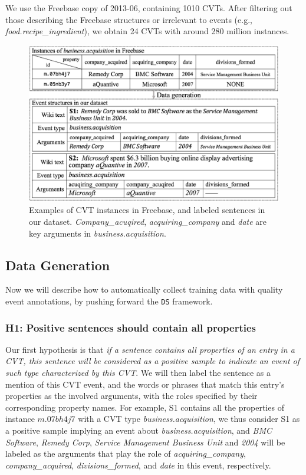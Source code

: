 We use the Freebase copy of 2013-06,  %
containing 1010 CVTs. After filtering out those %
describing the Freebase structures  or irrelevant to events (e.g., \emph{food.recipe\_ingredient}), we obtain 24 CVTs with around 280 million instances.    
%
\begin{figure}[h]
	\centering
	\includegraphics[width=.45\textwidth]{temp}
	\caption{Examples of CVT instances in Freebase, and labeled sentences in our dataset. \emph{Company\_acuqired}, \emph{acquiring\_company} and \emph{date} are key arguments in \emph{business.acquisition}. \label{fig:3}}
\end{figure}

\subsection{Data Generation\label{datagen}}
Now we will describe how to automatically collect training data with quality event annotations, by pushing forward the \texttt{DS} framework.
\subsubsection{H1: Positive sentences should contain all properties}
Our first hypothesis is that \textit{if a sentence contains all properties of an entry in a CVT, this sentence will be 
considered as a positive sample to indicate an event of such type characterized by this CVT}.  
We will then label the sentence as a mention of this CVT event, and the words or phrases that 
match this entry's properties as the involved arguments, with the roles specified by their 
corresponding property names. 
For example, S1 contains all the properties of instance $m.07bh4j7$ with a CVT type \emph{business.acquisition}, 
we thus consider S1 as a positive sample implying an event about \emph{business.acquisition}, and \emph{BMC Software}, \emph{Remedy Corp}, \emph{Service Management Business Unit} and \emph{2004} will be labeled as the arguments that play the role of \emph{acquiring\_company}, \emph{company\_acquired}, \emph{divisions\_formed}, and \emph{date} in this event, respectively.

